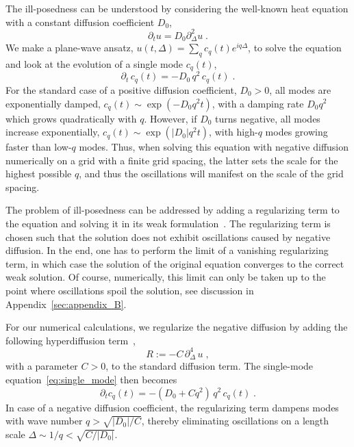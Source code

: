 \documentclass[
onecolumn,
aps,
prd,
amsmath,
amssymb,
nofootinbib
]{revtex4-2}
\begin{document}
The ill-posedness can be understood by considering the well-known heat equation with a constant diffusion coefficient $D_0$,
\begin{equation}
    \partial_t u = D_0\partial_\Delta^2 u\;.
\end{equation}
We make a plane-wave ansatz, $u(t,\Delta) = \sum_q c_q(t)e^{iq\Delta}$, to solve the equation and look at the evolution of a single mode $c_q(t)$, 
\begin{equation} \label{eq:single_mode}
	\partial_t \, c_q(t) = -D_0 \, q^2\, c_q(t)\;.
\end{equation}
For the standard case of a positive diffusion coefficient, $D_0>0$, all modes are exponentially damped, $c_q(t) \sim \exp(-D_0 q^2 t)$, with a damping rate $D_0 q^2$ which grows quadratically with $q$. 
However, if $D_0$ turns negative, all modes increase exponentially, $c_q(t) \sim \exp(|D_0| q^2 t)$, with high-$q$ modes growing faster than low-$q$ modes. 
Thus, when solving this equation with negative diffusion numerically on a grid with a finite grid spacing, the latter sets the scale for the highest possible $q$, and thus the oscillations will manifest on the scale of the grid spacing.

The problem of ill-posedness can be addressed by adding a regularizing term to the equation and solving it in its weak formulation~\cite{witelski1995shocks,miller2025shock}. 
The regularizing term is chosen such that the solution does not exhibit oscillations caused by negative diffusion. 
In the end, one has to perform the limit of a vanishing regularizing term, in which case the solution of the original equation converges to the correct weak solution.
Of course, numerically, this limit can only be taken up to the point where oscillations spoil the solution, see discussion in Appendix~\ref{sec:appendix_B}.


For our numerical calculations, we regularize the negative diffusion by adding the following hyperdiffusion term~\cite{Maron:2008sb},
\begin{equation}
	R := -C\,\partial_\Delta^4\, u\;,\label{eq:Regularization}
\end{equation}  
with a parameter $C>0$, to the standard diffusion term. 
The single-mode equation~\eqref{eq:single_mode} then becomes
\begin{equation}
	\partial_t c_q(t) = -(D_0 + Cq^2)\,q^2\, c_q(t)\;.
\end{equation}
In case of a negative diffusion coefficient, the regularizing term dampens modes with wave number $q>\sqrt{|D_0|/C}$, thereby eliminating oscillations on a length scale $\Delta \sim 1/q <  \sqrt{C/|D_0|}$.
\end{document}
